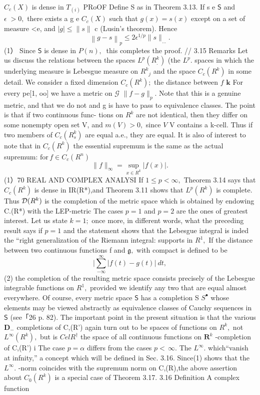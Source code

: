 $C_{c}(X)$ is dense in $\scriptstyle T_{(i)}$ PRoOF Define S as in Theorem 3.13. If s e $\boldsymbol{\mathsf{S}}$ and $\scriptstyle\epsilon\;>0,$ there exists a g e $C_{c}(X)$ such that $g(x)=s(x)$ except on a set of measure <e, and $|g|\leq\|s\|$ c (Lusin's theorem). Hence $$ \left\|g-s\right\|_{p}\leq2\epsilon^{1/p}\|s\|_{\ldots}. $$ (1） Since $\boldsymbol{\mathsf{S}}$ is dense in $\scriptstyle P(n){\mathrm{,~}}$ this completes the proof. // 3.15 Remarks Let us discuss the relations between the spaces $L^{p}(R_{.}^{k})$ (the $L^{p}.$ spaces in which the underlying measure is Lebesgue measure on $R^{k}{}_{j}$ and the space $C_{c}(R^{k})$ in some detail. We consider a fixed dimension $C_{c}(R^{k});$ the distance between $\boldsymbol{\mathit{f}}$ $\boldsymbol{k}$ For every pe[1, oo] we have a metric on $\scriptstyle{\mathcal{G}}$ $\|f-g\|_{p}.$ Note that this is a genuine metric, and that we do not and g is have to pass to equivalence classes. The point is that if two continuous func- tions on $R^{k}$ are not identical, then they differ on some nonempty open set V, and $m(V)>0,$ since ${\mathbf{}}V$ V contains a k-cell. Thus if two members of $C_{c}(R_{s}^{k})$ are equal a.e., they are equal. It is also of interest to note that in $C_{c}(R^{k})$ the essential supremum is the same as the actual supremum: $\mathrm{for}\,f\in C_{c}(R^{n})$ $$ \|f\|_{\infty}=\operatorname*{sup}_{x\in R^{k}}|f(x)|. $$ (1）$70$ REAL AND COMPLEX ANALYSI If $1\leq p<\infty,$ Theorem 3.14 says that $C_{c}(R^{k})$ is dense in IR(R*),and Theorem 3.11 shows that $L^{p}(R^{k})$ is complete. Thus ${\cal D}(R^{k})$ is the completion of the metric space which is obtained by endowing C.(R*) with the LEP-metric The cases $\scriptstyle{p=1}$ and $\scriptstyle{p=2}$ are the ones of greatest interest. Let us state $k=1;$ once more, in different words, what the preceding result says if $\scriptstyle{p=1}$ and the statement shows that the Lebesgue integral is inded the “right generalization of the Riemann integral: supports in $R^{1},$ If the distance between two continuous functions f and ${\mathfrak{g}},$ with compact is defined to be $$ \vert\sum_{-\infty}^{\infty}\vert f(t)-g(t)\vert\ d t, $$ (2) the completion of the resulting metric space consists precisely of the Lebesgue integrable functions on $R^{1},$ provided we identify any two that are equal almost everywhere. Of course, every metric space $\boldsymbol{\mathsf{S}}$ has a completion S $S^{\bullet}$ whose elements may be viewed abstractly as equivalence classes of Cauchy sequences in $\boldsymbol{\mathsf{S}}$ (see「26 p. 82). The important point in the present situation is that the various ${\boldsymbol{D}}_{-}$ completions of C,(R') again turn out to be spaces of functions on $R^{k},$ not $L^{\infty}(R^{k}),$ but is $\scriptstyle C e l R^{\dagger}$ the space of all continuous functions on ${\boldsymbol{R}}^{k}$ -completion of C,(R') i The case $p=\alpha$ differs from the cases $p<\,\infty.$ The $L^{\infty}.$ which“vanish at infnity,” a concept which will be defined in Sec. 3.16. Since(1) shows that the $L^{\infty}.$ -norm coincides with the supremum norm on C,(R),the above assertion about $C_{0}(R^{k})$ is a special case of Theorem 3.17. 3.16 Definition A complex function 